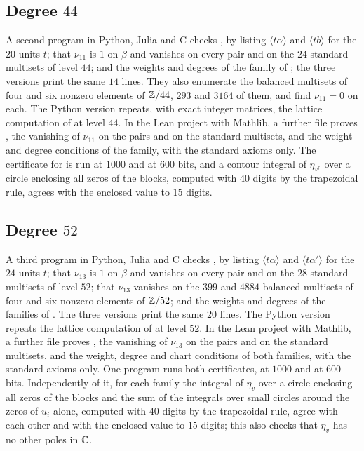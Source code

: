 \subsection*{Degree \texorpdfstring{$44$}{44}}
A second program in Python, Julia and C checks , by listing
$\langle t\alpha\rangle$ and $\langle tb\rangle$ for the $20$ units $t$; that
$\nu_{11}$ is $1$ on $\beta$ and vanishes on every pair and on the $24$
standard multisets of level $44$; and the weights and degrees of the family
of ; the three versions print the same $14$ lines. They also
enumerate the balanced multisets of four and six nonzero elements of
$\mathbb{Z}/44$, $293$ and $3164$ of them, and find $\nu_{11}=0$ on each. The Python version repeats,
with exact integer matrices, the lattice computation of 
at level $44$. In the Lean project with Mathlib, a further file proves
, the vanishing of $\nu_{11}$ on the pairs and on the
standard multisets, and the weight and degree conditions of the family, with
the standard axioms only. The certificate for  is run at
$1000$ and at $600$ bits, and a contour integral of $\eta_{v^{\dagger}}$
over a circle enclosing all zeros of the blocks, computed with $40$ digits
by the trapezoidal rule, agrees with the enclosed value to $15$ digits.

\subsection*{Degree \texorpdfstring{$52$}{52}}
A third program in Python, Julia and C checks , by listing
$\langle t\alpha\rangle$ and $\langle t\alpha'\rangle$ for the $24$ units
$t$; that $\nu_{13}$ is $1$ on $\beta$ and vanishes on every pair and on the
$28$ standard multisets of level $52$; that $\nu_{13}$ vanishes on the $399$
and $4884$ balanced multisets of four and six nonzero elements of $\mathbb{Z}/52$;
and the weights and degrees of the families of
. The three versions print the same $20$
lines. The Python version repeats the lattice computation of
 at level $52$. In the Lean project with Mathlib, a further
file proves , the vanishing of $\nu_{13}$ on the pairs and
on the standard multisets, and the weight, degree and chart conditions of
both families, with the standard axioms only. One program runs both
certificates, at $1000$ and at $600$ bits. Independently of it, for each
family the integral of $\eta_{v}$ over a circle enclosing all zeros of the
blocks and the sum of the integrals over small circles around the zeros of
$u_{i}$ alone, computed with $40$ digits by the trapezoidal rule, agree with
each other and with the enclosed value to $15$ digits; this also checks that
$\eta_{v}$ has no other poles in $\mathbb{C}$.

